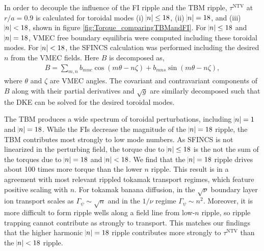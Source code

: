 \documentclass[aip, pop, preprint]{revtex4-1}
\numberwithin{figure}{section}
\numberwithin{equation}{section}
\begin{document}
In order to decouple the influence of the FI ripple and the TBM ripple, $\tau^{\text{NTV}}$ at $r/a = 0.9$ is calculated for toroidal modes (i) $\abs{n} \leq 18$, (ii) $\abs{n} = 18$, and (iii) $\abs{n} < 18$, shown in figure \ref{fig:Torque_comparingTBMandFI}. For $\abs{n} \leq 18$ and $\abs{n} = 18$, VMEC free boundary equilibria were computed including these toroidal modes. For $\abs{n} < 18$, the SFINCS calculation was performed including the desired $n$ from the VMEC fields. Here $B$ is decomposed as,
\begin{gather}
B = \sum_{m,n} b_{mnc} \cos(m\theta-n\zeta) + b_{mns} \sin(m\theta-n\zeta),
\end{gather}
where $\theta$ and $\zeta$ are VMEC angles. The covariant and contravariant components of $B$ along with their partial derivatives and $\sqrt{g}$ are similarly decomposed such that the DKE can be solved for the desired toroidal modes.

The TBM produces a wide spectrum of toroidal perturbations, including $\abs{n} = 1$ and $\abs{n} = 18$. While the FIs decrease the magnitude of the $\abs{n} =18$ ripple, the TBM contributes most strongly to low mode numbers. As SFINCS is not linearized in the perturbing field, the torque due to $\abs{n} \leq 18$ is the not the sum of the torques due to $\abs{n} = 18$ and $\abs{n} < 18$.  We find that the $\abs{n} = 18$ ripple drives about 100 times more torque than the lower $n$ ripple. This result is in a agreement with most relevant rippled tokamak transport regimes, which feature positive scaling with $n$. For tokamak banana diffusion, in the $\sqrt{\nu}$ boundary layer\cite{Shaing2008} ion transport scales as $\Gamma_{\psi} \sim \sqrt{n}$ and in the $1/\nu$ regime\cite{Shaing2003} $\Gamma_{\psi} \sim n^2$. Moreover, it is more difficult to form ripple wells along a field line from low-$n$ ripple, so ripple trapping cannot contribute as strongly to transport. This matches our findings that the higher harmonic $\abs{n} = 18$ ripple contributes more strongly to $\tau^{\text{NTV}}$ than the $\abs{n} < 18$ ripple. 
\end{document}
